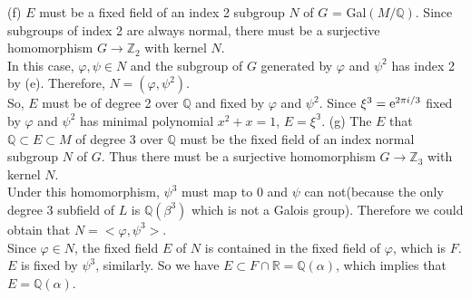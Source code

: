 \documentclass[11pt,a4paper]{ctexart}
\begin{document}
\newpage
\noindent(f) $E$ must be a fixed field of an index 2 subgroup $N$ of $G$ = Gal$(M/\mathbb{Q})$. Since subgroups of index 2 are always normal, there must be a surjective homomorphism $G\rightarrow \mathbb{Z}_2$ with kernel $N$.\\
In this case, $\varphi,\psi\in N$ and the subgroup of $G$ generated by $\varphi$ and $\psi^2$ has index 2 by (e). Therefore, $N=(\varphi,\psi^2)$.\\
So, $E$ must be of degree 2 over $\mathbb{Q}$ and fixed by $\varphi$ and $\psi^2$. Since $\xi^3=\textup{e}^{2\pi i/3}$ fixed by $\varphi$ and $\psi^2$ has minimal polynomial $x^2+x=1$, $E=\mathbb{\xi^3}$.
(g) The $E$ that $\mathbb{Q}\subset E\subset M$ of degree 3 over $\mathbb{Q}$ must be the fixed field of an index normal subgroup $N$ of $G$. Thus there must be a surjective homomorphism $G\rightarrow\mathbb{Z}_3$ with kernel $N$.\\
Under this homomorphism, $\psi^3$ must map to 0 and $\psi$ can not(because the only degree 3 subfield of $L$ is $\mathbb{Q}(\beta^3)$ which is not a Galois group). Therefore we could obtain that $N=<\varphi,\psi^3>$.\\
Since $\varphi\in N$, the fixed field $E$ of $N$ is contained in the fixed field of $\varphi$, which is $F$. $E$ is fixed by $\psi^3$, similarly. So we have $E\subset F\cap\mathbb{R}=\mathbb{Q}(\alpha)$, which implies that $E=\mathbb{Q}(\alpha)$.
\vspace{10mm}\\
\end{document}
